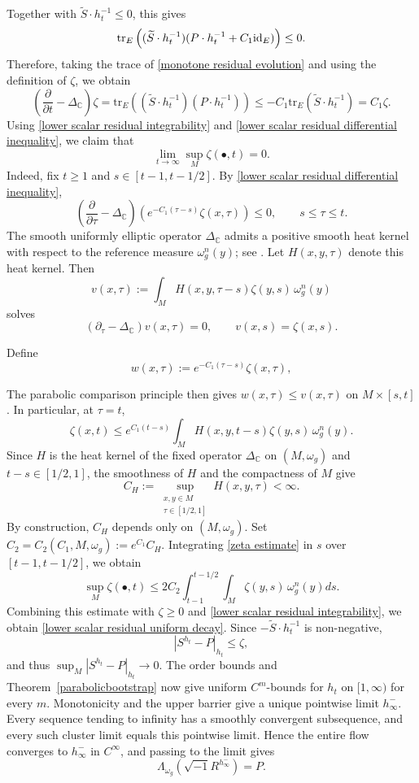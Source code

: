 \documentclass[12pt, reqno]{amsart}
\newcommand{\id}{{\rm id}}
\theoremstyle{plain}
\theoremstyle{definition}
\newcommand{\sq}{\sqrt{-1}}
\newcommand{\p}{\partial}
\newcommand{\beq}{\begin{equation}}
\newcommand{\eeq}{\end{equation}}
\renewcommand{\tilde}{\widetilde}
\renewcommand{\>}{\rightarrow}
\newcommand{\C}{{\mathbb C}}
\renewcommand{\>}{\rightarrow}
\renewcommand{\p}{{\partial}}
\renewcommand{\tilde}{\widetilde}
\newcommand{\tr}{\mathrm{tr}}
\numberwithin{equation}{section} %
\begin{document}
Together with $\tilde S\cdot h_t^{-1}\leq0$, this gives
\[
\tr_E\left(
(\tilde S\cdot h_t^{-1})
(P\cdot h_t^{-1}+C_1\id_E)
\right)\leq0.
\]
Therefore, taking the trace of
\eqref{monotone residual evolution} and using the definition of $\zeta$,
we obtain
\beq
\left(\frac{\p}{\p t}-\Delta_\C\right)\zeta
=\tr_E\left(
(\tilde S\cdot h_t^{-1})(P\cdot h_t^{-1})
\right)
\leq-C_1\tr_E\left(\tilde S\cdot h_t^{-1}\right)
=C_1\zeta.
\label{lower scalar residual differential inequality}
\eeq
Using \eqref{lower scalar residual integrability} and \eqref{lower scalar residual differential inequality}, we claim that
\beq
\lim_{t\to\infty}\sup_M \zeta(\bullet,t)=0.
\label{lower scalar residual uniform decay}
\eeq
Indeed, fix $t\geq1$ and $s\in[t-1,t-1/2]$. By \eqref{lower scalar residual differential inequality},
\beq
\left(\frac{\p}{\p \tau}-\Delta_\C\right)
\left(e^{-C_1(\tau-s)}\zeta(x,\tau)\right)\leq0,
\qquad s\leq\tau\leq t.
\eeq
The smooth uniformly elliptic operator $\Delta_\C$ admits a positive smooth heat kernel with respect to the reference measure $\omega_g^n(y)$; see \cite[Sections~6.2--6.4]{Str08}. Let $H(x,y,\tau)$ denote this heat kernel. Then
\beq
v(x,\tau):=\int_M H(x,y,\tau-s)\zeta(y,s)\,\omega_g^n(y)
\eeq
solves
\beq
\left(\p_\tau-\Delta_\C\right)v(x,\tau)=0,
\qquad v(x,s)=\zeta(x,s).
\eeq

\noindent Define
\beq
w(x,\tau):=e^{-C_1(\tau-s)}\zeta(x,\tau),
\eeq

\noindent The parabolic comparison principle then gives $w(x,\tau)\leq v(x,\tau)$ on $M\times[s,t]$. In particular, at $\tau=t$,
\beq
\zeta(x,t)\leq e^{C_1(t-s)}\int_M H(x,y,t-s)\zeta(y,s)\,\omega_g^n(y).
\label{zeta estimate}
\eeq
Since $H$ is the heat kernel of the fixed operator $\Delta_\C$ on $(M,\omega_g)$ and $t-s\in[1/2,1]$, the smoothness of $H$ and the compactness of $M$ give
\[
C_H:=\sup_{\substack{x,y\in M\\\tau\in[1/2,1]}}
H(x,y,\tau)<\infty.
\]
By construction, $C_H$ depends only on $(M,\omega_g)$. Set $C_2=C_2(C_1,M,\omega_g):=e^{C_1}C_H$.
Integrating \eqref{zeta estimate} in $s$ over $[t-1,t-1/2]$, we obtain
\beq
\sup_M \zeta(\bullet,t)
\leq2C_2\int_{t-1}^{t-1/2}\int_M \zeta(y,s)\,\omega_g^n(y)ds.
\eeq
Combining this estimate with $\zeta\geq0$ and \eqref{lower scalar residual integrability}, we obtain \eqref{lower scalar residual uniform decay}.
Since $-\tilde S\cdot h_t^{-1}$ is non-negative,
\beq
|S^{h_t}-P|_{h_t}
\leq \zeta,
\eeq
and thus $\sup_M|S^{h_t}-P|_{h_t}\to0$.
The order bounds and Theorem~\ref{parabolicbootstrap} now give uniform $C^m$-bounds for $h_t$ on $[1,\infty)$ for every $m$. Monotonicity and the upper barrier give a unique pointwise limit $h^-_\infty$. Every sequence tending to infinity has a smoothly convergent subsequence, and every such cluster limit equals this pointwise limit. Hence the entire flow converges to $h^-_\infty$ in $C^\infty$, and passing to the limit gives
\beq
\Lambda_{\omega_g}\left(\sq R^{h^-_\infty}\right)=P.
\eeq
\end{document}
